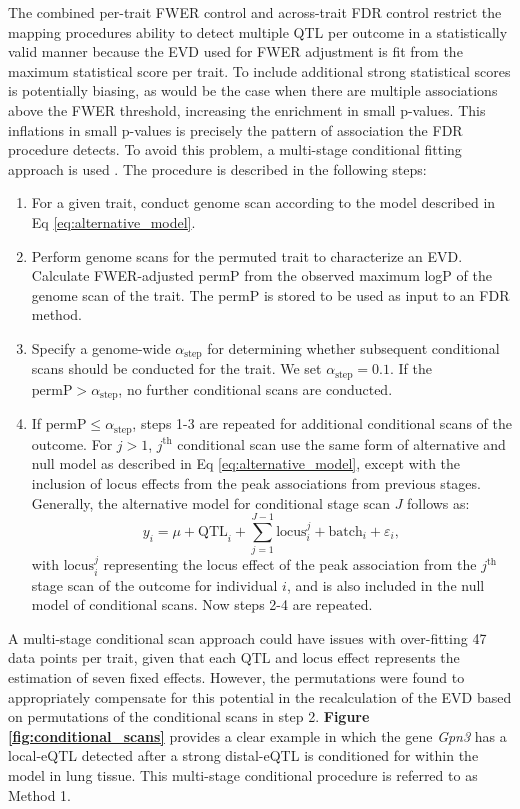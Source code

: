 \documentclass[9pt,twocolumn,twoside]{gsajnl}
\begin{document}
The combined per-trait FWER control and across-trait FDR control restrict the mapping procedures ability to detect multiple QTL per outcome in a statistically valid manner because the EVD used for FWER adjustment is fit from the maximum statistical score per trait. To include additional strong statistical scores is potentially biasing, as would be the case when there are multiple associations above the FWER threshold, increasing the enrichment in small p-values. This inflations in small p-values is precisely the pattern of association the FDR procedure detects. To avoid this problem, a multi-stage conditional fitting approach is used \citep{Jansen2017}. The procedure is described in the following steps:
\begin{enumerate}
	\item For a given trait, conduct genome scan according to the model described in Eq \ref{eq:alternative_model}.
    \item Perform genome scans for the permuted trait to characterize an EVD. Calculate FWER-adjusted permP from the observed maximum logP of the genome scan of the trait. The permP is stored to be used as input to an FDR method.
    \item Specify a genome-wide $\alpha_{\text{step}}$ for determining whether subsequent conditional scans should be conducted for the trait. We set $\alpha_{\text{step}} = 0.1$. If the $\text{permP} > \alpha_{\text{step}}$, no further conditional scans are conducted.
    \item If $\text{permP} \le \alpha_{\text{step}}$, steps 1-3 are repeated for additional conditional scans of the outcome. For $j > 1$, $j^{\text{th}}$ conditional scan use the same form of alternative and null model as described in Eq \ref{eq:alternative_model}, except with the inclusion of locus effects from the peak associations from previous stages. Generally, the alternative model for conditional stage scan $J$ follows as:
\begin{equation}
y_{i} = \mu + \text{QTL}_{i} + \sum_{j=1}^{J-1}\text{locus}_{i}^{j} + \text{batch}_{i} + \varepsilon_{i},
\label{eq:conditional_model}
\end{equation}
with $\text{locus}_{i}^{j}$ representing the locus effect of the peak association from the $j^{\text{th}}$ stage scan of the outcome for individual $i$, and is also included in the null model of conditional scans. Now steps 2-4 are repeated.
\end{enumerate}

A multi-stage conditional scan approach could have issues with over-fitting 47 data points per trait, given that each $\text{QTL}$ and $\text{locus}$ effect represents the estimation of seven fixed effects. However, the permutations were found to appropriately compensate for this potential in the recalculation of the EVD based on permutations of the conditional scans in step 2. \textbf{Figure \ref{fig:conditional_scans}} provides a clear example in which the gene \textit{Gpn3} has a local-eQTL detected after a strong distal-eQTL is conditioned for within the model in lung tissue. This multi-stage conditional procedure is referred to as Method 1.
\end{document}
